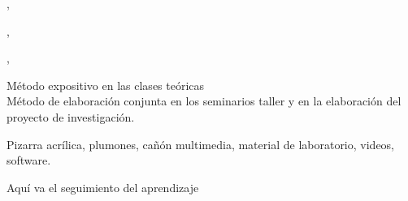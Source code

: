 \documentclass[a4paper,8pt]{article}
\begin{document}
\begin{contenidos}
\cite{Guttag13}, \cite{Zelle10} 


\nextUnidad{\SDFAlgorithmsandDesign}
\nextCapitulo{\SDFAlgorithmsandDesign}
\nextTema{\SDFAlgorithmsandDesignTopicThe}
\nextTema{\SDFAlgorithmsandDesignTopicTheRole}
\nextTema{\SDFAlgorithmsandDesignTopicProblem}
\nextTema{\SDFAlgorithmsandDesignTopicFundamental}

\cite{Guttag13}, \cite{Zelle10} 


\nextUnidad{\SDFDevelopmentMethods}
\nextCapitulo{\SDFDevelopmentMethods}
\nextTema{\SDFDevelopmentMethodsTopicModern}

\cite{Guttag13}, \cite{Zelle10} 





\end{contenidos}




\begin{estrategiasEnsenanza}
    \begin{metodos}
        Método expositivo en las clases teóricas \\
        Método de elaboración conjunta en los seminarios taller y en la elaboración del proyecto de investigación.
    \end{metodos}
    \begin{medios}
        Pizarra acrílica, plumones, cañón multimedia, material de laboratorio, videos, software.
    \end{medios}
    \begin{formasOrganizacion}
    \end{formasOrganizacion}
    \begin{programacion}
    \end{programacion}
    \begin{segumientoAprendizaje}
        Aquí va el seguimiento del aprendizaje
    \end{segumientoAprendizaje}
\end{estrategiasEnsenanza}
\end{document}

